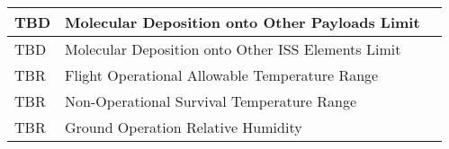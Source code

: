 \begin{table}[htbp]
\begin{minipage}{\linewidth}
\begin{tabular}{| >{\centering\arraybackslash}m{1.25in}| >{\centering\arraybackslash}m{2.95in}| >{\centering\arraybackslash}m{1.5in}|}
 \hline 
TBD & Molecular Deposition onto Other Payloads Limit & \pageref{tbx_17}  \\ 
 \hline 
TBD & Molecular Deposition onto Other ISS Elements Limit & \pageref{tbx_18}  \\ 
 \hline 
TBR & Flight Operational Allowable Temperature Range & \pageref{tbx_19}  \\ 
 \hline 
TBR & Non-Operational Survival Temperature Range & \pageref{tbx_20}  \\ 
 \hline 
TBR & Ground Operation Relative Humidity & \pageref{tbx_21}  \\ 
 \hline 
\end{tabular}
        \end{minipage}
        \end{table}
        \raggedright
        \clearpage